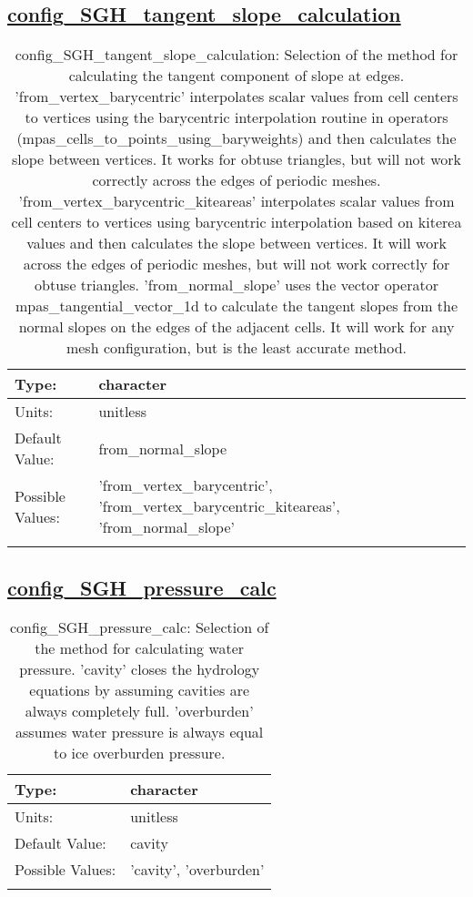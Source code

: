 \subsection[config\_SGH\_tangent\_slope\_calculation]{\hyperref[sec:nm_tab_subglacial_hydro]{config\_SGH\_tangent\_slope\_calculation}}
\label{subsec:nm_sec_config_SGH_tangent_slope_calculation}
\begin{center}
\begin{longtable}{| p{2.0in} || p{4.0in} |}
    \hline
    Type: & character \\
    \hline
    Units: & \si{unitless} \\
    \hline
    Default Value: & from\_normal\_slope \\
    \hline
    Possible Values: & 'from\_vertex\_barycentric', 'from\_vertex\_barycentric\_kiteareas', 'from\_normal\_slope' \\
    \hline
    \caption{config\_SGH\_tangent\_slope\_calculation: Selection of the method for calculating the tangent component of slope at edges. 'from\_vertex\_barycentric' interpolates scalar values from cell centers to vertices using the barycentric interpolation routine in operators (mpas\_cells\_to\_points\_using\_baryweights) and then calculates the slope between vertices.  It works for obtuse triangles, but will not work correctly across the edges of periodic meshes. 'from\_vertex\_barycentric\_kiteareas' interpolates scalar values from cell centers to vertices using barycentric interpolation based on kiterea values and then calculates the slope between vertices.  It will work across the edges of periodic meshes, but will not work correctly for obtuse triangles. 'from\_normal\_slope' uses the vector operator mpas\_tangential\_vector\_1d to calculate the tangent slopes from the normal slopes on the edges of the adjacent cells.  It will work for any mesh configuration, but is the least accurate method.}
\end{longtable}
\end{center}
\subsection[config\_SGH\_pressure\_calc]{\hyperref[sec:nm_tab_subglacial_hydro]{config\_SGH\_pressure\_calc}}
\label{subsec:nm_sec_config_SGH_pressure_calc}
\begin{center}
\begin{longtable}{| p{2.0in} || p{4.0in} |}
    \hline
    Type: & character \\
    \hline
    Units: & \si{unitless} \\
    \hline
    Default Value: & cavity \\
    \hline
    Possible Values: & 'cavity', 'overburden' \\
    \hline
    \caption{config\_SGH\_pressure\_calc: Selection of the method for calculating water pressure. 'cavity' closes the hydrology equations by assuming cavities are always completely full. 'overburden' assumes water pressure is always equal to ice overburden pressure.}
\end{longtable}
\end{center}
